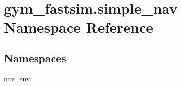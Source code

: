 \hypertarget{namespacegym__fastsim_1_1simple__nav}{}\section{gym\+\_\+fastsim.\+simple\+\_\+nav Namespace Reference}
\label{namespacegym__fastsim_1_1simple__nav}
\subsection*{Namespaces}
\begin{DoxyCompactItemize}
\item 
 \hyperlink{namespacegym__fastsim_1_1simple__nav_1_1nav__env}{nav\+\_\+env}
\end{DoxyCompactItemize}
